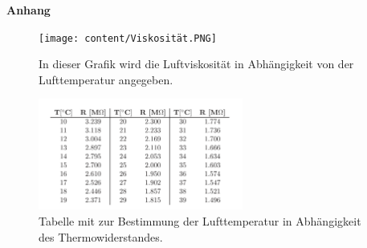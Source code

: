 \newpage

\Large\textbf{Anhang}


%    
%
%
%    

\begin{figure}
    \centering
    \texttt{[image: content/Viskosität.PNG]}
    \caption{In dieser Grafik wird die Luftviskosität in Abhängigkeit von der Lufttemperatur angegeben. \cite{v503}}
    \label{fig:viskosität}
\end{figure}

\begin{figure}
    \centering
    \includegraphics[width = 0.6\textwidth]{content/Thermowiderstand.PNG}
    \caption{Tabelle mit zur Bestimmung der Lufttemperatur in Abhängigkeit des Thermowiderstandes. \cite{v503}}
    \label{fig:Temperatur}
\end{figure}